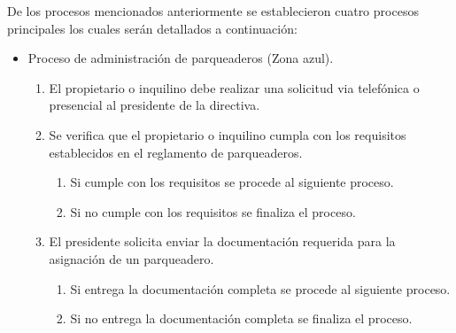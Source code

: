 De los procesos mencionados anteriormente se establecieron cuatro procesos principales los cuales serán detallados a continuación:
\begin{itemize}
    \item Proceso de administración de parqueaderos (Zona azul).
    \begin{enumerate}
        \item El propietario o inquilino debe realizar una solicitud via telefónica o presencial al presidente de la directiva.
        \item Se verifica que el propietario o inquilino cumpla con los requisitos establecidos en el reglamento de parqueaderos.
        \begin{enumerate}
            \item Si cumple con los requisitos se procede al siguiente proceso.
            \item Si no cumple con los requisitos se finaliza el proceso.
        \end{enumerate}
        \item El presidente solicita enviar la documentación requerida para la asignación de un parqueadero.
        \begin{enumerate}
            \item Si entrega la documentación completa se procede al siguiente proceso.
            \item Si no entrega la documentación completa se finaliza el proceso.
        \end{enumerate}


\end{enumerate}
\end{itemize}
